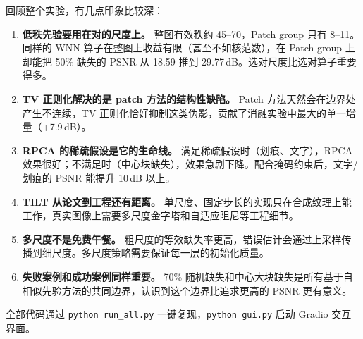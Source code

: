 \documentclass[10.5pt, a4paper]{article}
\begin{document}
回顾整个实验，有几点印象比较深：

\begin{enumerate}[leftmargin=*,itemsep=2pt]
    \item \textbf{低秩先验要用在对的尺度上。} 整图有效秩约 45--70，Patch group 只有 8--11。同样的 WNN 算子在整图上收益有限（甚至不如核范数），在 Patch group 上却能把 50\% 缺失的 PSNR 从 18.59 推到 29.77\,dB。选对尺度比选对算子重要得多。

    \item \textbf{TV 正则化解决的是 patch 方法的结构性缺陷。} Patch 方法天然会在边界处产生不连续，TV 正则化恰好抑制这类伪影，贡献了消融实验中最大的单一增量（+7.9\,dB）。

    \item \textbf{RPCA 的稀疏假设是它的生命线。} 满足稀疏假设时（划痕、文字），RPCA 效果很好；不满足时（中心块缺失），效果急剧下降。配合掩码约束后，文字/划痕的 PSNR 能提升 10\,dB 以上。

    \item \textbf{TILT 从论文到工程还有距离。} 单尺度、固定步长的实现只在合成纹理上能工作，真实图像上需要多尺度金字塔和自适应阻尼等工程细节。

    \item \textbf{多尺度不是免费午餐。} 粗尺度的等效缺失率更高，错误估计会通过上采样传播到细尺度。多尺度策略需要保证每一层的初始化质量。

    \item \textbf{失败案例和成功案例同样重要。} 70\% 随机缺失和中心大块缺失是所有基于自相似先验方法的共同边界，认识到这个边界比追求更高的 PSNR 更有意义。
\end{enumerate}

全部代码通过 \texttt{python run\_all.py} 一键复现，\texttt{python gui.py} 启动 Gradio 交互界面。
\end{document}
